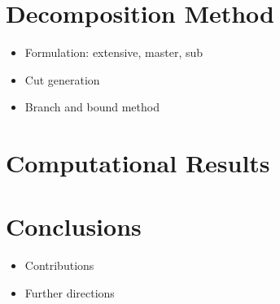 \documentclass[11pt]{article}
\begin{document}
\section{Decomposition Method} \label{sec:decomposition}
	\begin{itemize}
		\item Formulation: extensive, master, sub
		\item Cut generation
		\item Branch and bound method
	\end{itemize}

\section{Computational Results} \label{sec:results}

\section{Conclusions} \label{sec:conclusions}
	\begin{itemize}
		\item Contributions
		\item Further directions
	\end{itemize}



\end{document}
